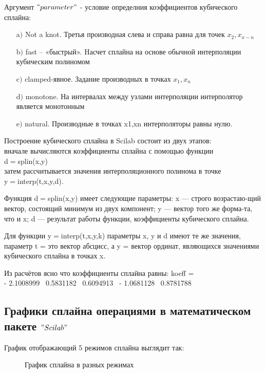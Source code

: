 \documentclass[russian,utf8,nocolumnxxxi,nocolumnxxxii]{eskdtext}
\begin{document}
Аргумент $"parameter"$ - условие определния коэффициентов кубического сплайна:
\begin{enumerate}
  \item[a$)$] Not \makebox[0,3cm]{\hrulefill} a             \makebox[0,3cm]{\hrulefill} knot. Третья производная слева и справа равна для точек $x_2,x_{x-n}$
  \item[b$)$] fast – «быстрый». Hасчет сплайна на основе обычной интерполяции кубическим полиномом
  \item[c$)$] clamped-явное. Задание производных в точках $x_1,x_n$
  \item[d$)$] monotone. На интервалах между узлами интерполяции интерполятор является монотонным
  \item[e$)$] natural. Производные в точках x1,xn интерполяторы равны нулю.
\end{enumerate}

Построение кубического сплайна в Scilab состоит из двух этапов:\\ вначале вычисляются коэффициенты сплайна с помощью функции\\ d$=$splin(x,y)\\

затем рассчитывается значения интерполяционного полинома в точке\\ y$=$interp(t,x,y,d).

Функция d$=$splin(x,y) имеет следующие параметры: x — строго возрастаю-щий вектор, состоящий минимум из двух компонент; y — вектор того же форма-та, что и x; d — результат работы функции, коэффициенты кубического сплайна.

Для функции y$=$interp(t,x,y,k) параметры x, y и d имеют те же значения,
параметр t = это вектор абсцисс, а y = вектор ординат, являющихся значениями
кубического сплайна в точках x.

Из расчётов ясно что коэффициенты сплайна равны:
koeff  =\\

  - 2.1008999 \   0.5831182  \  0.6094913 \ - 1.0681128 \   0.8781788 \\
  \newpage
\subsection{Графики сплайна операциями в математическом пакете $"Scilab"$}
    

График отображающий 5 режимов сплайна выглядит так:
\begin{figure}[h!]
\caption*{График сплайна в разных режимах}
\end{figure}
\end{document}
